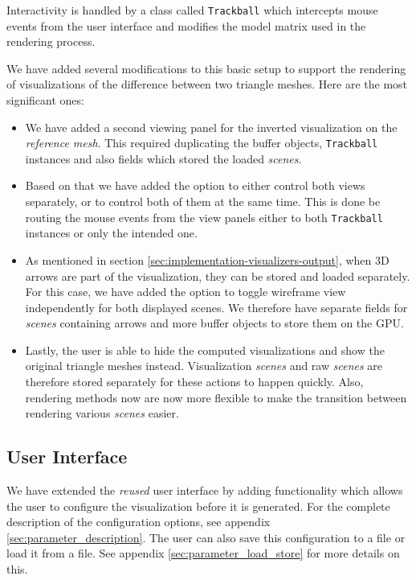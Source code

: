 Interactivity is handled by a class called \verb+Trackball+ which intercepts mouse events from the user interface and modifies the model matrix used in the rendering process.

We have added several modifications to this basic setup to support the rendering of visualizations of the difference between two triangle meshes. Here are the most significant ones:

\begin{itemize}
\item We have added a second viewing panel for the inverted visualization on the {\it reference mesh}. This required duplicating the buffer objects, \verb+Trackball+ instances and also fields which stored the loaded {\it scenes}.
\item Based on that we have added the option to either control both views separately, or to control both of them at the same time. This is done be routing the mouse events from the view panels either to both \verb+Trackball+ instances or only the intended one.
\item As mentioned in section \ref{sec:implementation-visualizers-output}, when 3D arrows are part of the visualization, they can be stored and loaded separately. For this case, we have added the option to toggle wireframe view independently for both displayed scenes. We therefore have separate fields for {\it scenes} containing arrows and more buffer objects to store them on the GPU.
\item Lastly, the user is able to hide the computed visualizations and show the original triangle meshes instead. Visualization {\it scenes} and raw {\it scenes} are therefore stored separately for these actions to happen quickly. Also, rendering methods now are now more flexible to make the transition between rendering various {\it scenes} easier.
\end{itemize}

\subsection{User Interface}

We have extended the {\it reused} user interface by adding functionality which allows the user to configure the visualization before it is generated. For the complete description of the configuration options, see appendix \ref{sec:parameter_description}. The user can also save this configuration to a file or load it from a file. See appendix \ref{sec:parameter_load_store} for more details on this.

